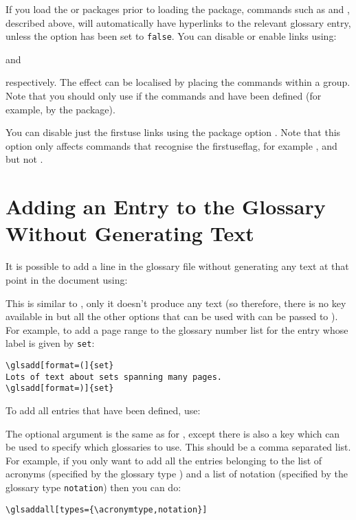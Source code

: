 \documentclass[report]{nlctdoc}
\newcommand*{\firstuseflag}{\gls{firstuseflag}}
\newcommand*{\gloskey}[2][newglossaryentry]{\csopt{#1}{#2}}
\begin{document}
If you load the  or  packages prior to
loading the  package, commands such as 
and , described above, will automatically have hyperlinks
to the relevant glossary entry, unless the \gloskey[glslink]{hyper}
option has been set to \texttt{false}. You can disable or enable links using:
\begin{definition}[\DescribeMacro{\glsdisablehyper}]
\end{definition}
and
\begin{definition}[\DescribeMacro{\glsenablehyper}]
\end{definition}
respectively. The effect can be localised by placing the commands
within a group. Note that you should only use 
if the commands  and  have been
defined (for example, by the  package).

You can disable just the \gls{firstuse} links using the package
option . Note that this option only
affects commands that recognise the \firstuseflag, for example
,  and  but not .


\chapter{Adding an Entry to the Glossary Without Generating Text}
\label{sec:glsadd}

It is possible to add a line in the glossary file without
generating any text at that point in the document using:
\begin{definition}[\DescribeMacro{\glsadd}]
\end{definition}
This is similar to , only it doesn't produce
any text (so therefore, there is no \gloskey[glslink]{hyper} key
available in  but all the other options that can
be used with  can be passed to ).
For example, to add a page range to the glossary number list for the
entry whose label is given by \texttt{set}:
\begin{verbatim}
\glsadd[format=(]{set}
Lots of text about sets spanning many pages.
\glsadd[format=)]{set}
\end{verbatim}

To add all entries that have been defined, use:
\begin{definition}[\DescribeMacro{\glsaddall}]
\end{definition}
The optional argument is the same as for , except
there is also a key \gloskey[glsaddall]{types} which can be
used to specify which glossaries to use. This should be a
comma separated list. For example, if you only want to add
all the entries belonging to the list of acronyms (specified by
the glossary type ) and a list of
notation (specified by the glossary type \texttt{notation}) then you can
do:
\begin{verbatim}
\glsaddall[types={\acronymtype,notation}]
\end{verbatim}
\end{document}
